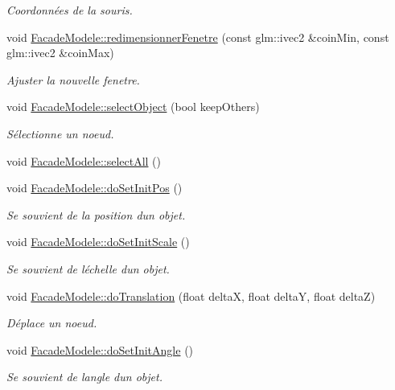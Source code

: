 \begin{DoxyCompactItemize}
\begin{DoxyCompactList}\small\item\em Coordonnées de la souris. \end{DoxyCompactList}\item 
void \hyperlink{group__inf2990_ga0a03742a7fa2215a6dd6de99cbfd7b05}{Facade\+Modele\+::redimensionner\+Fenetre} (const glm\+::ivec2 \&coin\+Min, const glm\+::ivec2 \&coin\+Max)
\begin{DoxyCompactList}\small\item\em Ajuster la nouvelle fenetre. \end{DoxyCompactList}\item 
void \hyperlink{group__inf2990_gaa1eea4eb52c6ec22980e0b21e2bdbcd4}{Facade\+Modele\+::select\+Object} (bool keep\+Others)
\begin{DoxyCompactList}\small\item\em Sélectionne un noeud. \end{DoxyCompactList}\item 
void \hyperlink{group__inf2990_ga91c3543726ad826767a5f1fdd42138f8}{Facade\+Modele\+::select\+All} ()
\item 
void \hyperlink{group__inf2990_gacbc609209644f410f7a576a8d1e509d0}{Facade\+Modele\+::do\+Set\+Init\+Pos} ()
\begin{DoxyCompactList}\small\item\em Se souvient de la position d\textquotesingle{}un objet. \end{DoxyCompactList}\item 
void \hyperlink{group__inf2990_gaccc885ec8fc20fa6709a2f74a609ce32}{Facade\+Modele\+::do\+Set\+Init\+Scale} ()
\begin{DoxyCompactList}\small\item\em Se souvient de l\textquotesingle{}échelle d\textquotesingle{}un objet. \end{DoxyCompactList}\item 
void \hyperlink{group__inf2990_ga3c29bb5fb742aacf7bea3f62357c4f48}{Facade\+Modele\+::do\+Translation} (float delta\+X, float delta\+Y, float delta\+Z)
\begin{DoxyCompactList}\small\item\em Déplace un noeud. \end{DoxyCompactList}\item 
void \hyperlink{group__inf2990_gadf7aee8a39d60a055bef3cd05cdda2db}{Facade\+Modele\+::do\+Set\+Init\+Angle} ()
\begin{DoxyCompactList}\small\item\em Se souvient de l\textquotesingle{}angle d\textquotesingle{}un objet. \end{DoxyCompactList}\item 

\end{DoxyCompactItemize}

